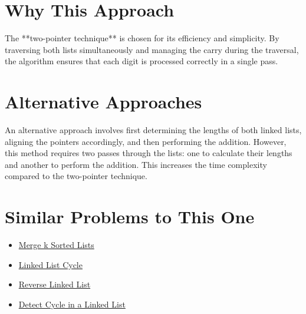 \section*{Why This Approach}
The **two-pointer technique** is chosen for its efficiency and simplicity. By traversing both lists simultaneously and managing the carry during the traversal, the algorithm ensures that each digit is processed correctly in a single pass.

\section*{Alternative Approaches}
An alternative approach involves first determining the lengths of both linked lists, aligning the pointers accordingly, and then performing the addition. However, this method requires two passes through the lists: one to calculate their lengths and another to perform the addition. This increases the time complexity compared to the two-pointer technique.

\section*{Similar Problems to This One}
\begin{itemize}
    \item \hyperref[problem:merge_k_sorted_lists]{Merge k Sorted Lists}
    \item \hyperref[problem:linked_list_cycle]{Linked List Cycle}
    \item \hyperref[problem:reverse_linked_list]{Reverse Linked List}
    \item \hyperref[problem:detect_cycle]{Detect Cycle in a Linked List}
\end{itemize}

